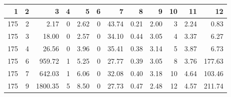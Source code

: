 \begin{tabular}{rrrrrrrrrrrr}
\toprule
1 & 2 & 3 & 4 & 5 & 6 & 7 & 8 & 9 & 10 & 11 & 12 \\
\midrule
175 & 2 & 2.17 & 0 & 2.62 & 0 & 43.74 & 0.21 & 2.00 & 3 & 2.24 & 0.83 \\
175 & 3 & 18.00 & 0 & 2.57 & 0 & 34.10 & 0.44 & 3.05 & 4 & 3.37 & 6.27 \\
175 & 4 & 26.56 & 0 & 3.96 & 0 & 35.41 & 0.38 & 3.14 & 5 & 3.87 & 6.73 \\
175 & 6 & 959.72 & 1 & 5.25 & 0 & 27.77 & 0.39 & 3.05 & 8 & 3.76 & 177.63 \\
175 & 7 & 642.03 & 1 & 6.06 & 0 & 32.08 & 0.40 & 3.18 & 10 & 4.64 & 103.46 \\
175 & 9 & 1800.35 & 5 & 8.50 & 0 & 27.73 & 0.47 & 2.48 & 12 & 4.57 & 211.74 \\
\bottomrule
\end{tabular}
